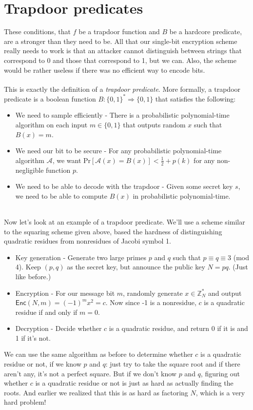 \documentclass[10pt]{article}
\begin{document}
\section{Trapdoor predicates}
These conditions, that $ f $ be a trapdoor function and $ B $ be a hardcore predicate, are a stronger than they need to be.  All that our single-bit encryption scheme really needs to work is that an attacker cannot distinguish between strings that correspond to 0 and those that correspond to 1, but we can.  Also, the scheme would be rather useless if there was no efficient way to encode bits.
\\ ~ \\
This is exactly the definition of a \textit{trapdoor predicate}.  More formally, a trapdoor predicate is a boolean function $ B: \{ 0,1 \}^\ast \Rightarrow \{ 0,1 \} $ that satisfies the following:
\begin{itemize}
\item We need to sample efficiently - There is a probabilistic polynomial-time algorithm on each input $ m \in \{0, 1\} $ that outputs random $ x $ such that $ B(x) = m $.
\item We need our bit to be secure - For any probabilistic polynomial-time algorithm $ \mathcal{A} $, we want $ \text{Pr}[\mathcal{A}(x) = B(x)] < \frac{1}{2} + p(k) $ for any non-negligible function $ p $.
\item We need to be able to decode with the trapdoor - Given some secret key $ s $, we need to be able to compute $ B(x) $ in probabilistic polynomial-time.
\end{itemize}
~ \\
Now let's look at an example of a trapdoor predicate.  We'll use a scheme similar to the squaring scheme given above, based the hardness of distinguishing quadratic residues from nonresidues of Jacobi symbol 1.
\begin{itemize}
\item Key generation - Generate two large primes $ p $ and $ q $ such that $ p \equiv q \equiv 3 $ (mod 4).  Keep $ (p,q) $ as the secret key, but announce the public key $ N = pq $.  (Just like before.)
\item Encryption - For our message bit $ m $, randomly generate $ x \in \mathbb{Z}_N^\ast $ and output $ \mathsf{Enc}(N, m) = (-1)^mx^2 = c $.  Now since -1 is a nonresidue, $ c $ is a quadratic residue if and only if $ m = 0 $.
\item Decryption - Decide whether $ c $ is a quadratic residue, and return 0 if it is and 1 if it's not.
\end{itemize}
We can use the same algorithm as before to determine whether $ c $ is a quadratic residue or not, if we know $ p $ and $ q $: just try to take the square root and if there aren't any, it's not a perfect square.  But if we don't know $ p $ and $ q $, figuring out whether $ c $ is a quadratic residue or not is just as hard as actually finding the roots.  And earlier we realized that this is as hard as factoring $ N $, which is a very hard problem!
\end{document}
